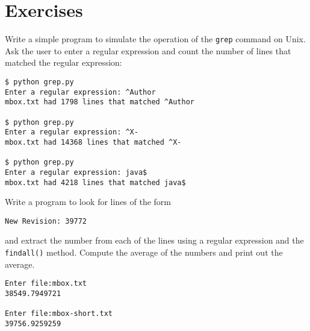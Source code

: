 \section{Exercises}

\begin{ex}
Write a simple program to simulate the operation of the {\tt grep} command
on Unix.  Ask the user to enter a regular expression and count the number
of lines that matched the regular expression:

\beforeverb
\begin{verbatim}
$ python grep.py
Enter a regular expression: ^Author
mbox.txt had 1798 lines that matched ^Author

$ python grep.py
Enter a regular expression: ^X-
mbox.txt had 14368 lines that matched ^X-

$ python grep.py
Enter a regular expression: java$
mbox.txt had 4218 lines that matched java$
\end{verbatim}
\afterverb
%
\end{ex}

\begin{ex}
Write a program to look for lines of the form

\verb"New Revision: 39772"

and extract the number from each of the lines using a regular expression
and the {\tt findall()} method.  Compute the average of the numbers and
print out the average.

\beforeverb
\begin{verbatim}
Enter file:mbox.txt
38549.7949721

Enter file:mbox-short.txt
39756.9259259
\end{verbatim}
\afterverb
%

\end{ex}


